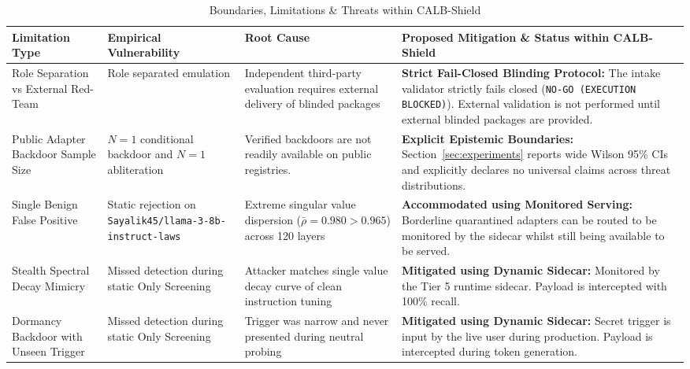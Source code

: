\documentclass[conference]{IEEEtran}
\begin{document}
\begin{table}[t]
\centering
\caption{Boundaries, Limitations \& Threats within CALB-Shield}
\label{tab:limitations}
\begin{tabularx}{\textwidth}{p{3.2cm}p{3.2cm}p{3.8cm}X}
\toprule
\textbf{Limitation Type} & \textbf{Empirical Vulnerability} & \textbf{Root Cause} & \textbf{Proposed Mitigation \& Status within CALB-Shield} \\
\midrule
Role Separation vs External Red-Team & Role separated emulation & Independent third-party evaluation requires external delivery of blinded packages & \textbf{Strict Fail-Closed Blinding Protocol:} The intake validator strictly fails closed (\texttt{NO-GO (EXECUTION BLOCKED)}). External validation is not performed until external blinded packages are provided. \\
\midrule
Public Adapter Backdoor Sample Size & $N=1$ conditional backdoor and $N=1$ abliteration & Verified backdoors are not readily available on public registries. & \textbf{Explicit Epistemic Boundaries:} Section~\ref{sec:experiments} reports wide Wilson 95\% CIs and explicitly declares no universal claims across threat distributions. \\
\midrule
Single Benign False Positive & Static rejection on \nolinkurl{Sayalik45/llama-3-8b-instruct-laws} & Extreme singular value dispersion ($\bar{\rho}=0.980 > 0.965$) across 120 layers & \textbf{Accommodated using Monitored Serving:} Borderline quarantined adapters can be routed to be monitored by the sidecar whilst still being available to be served. \\
\midrule
Stealth Spectral Decay Mimicry & Missed detection during static Only Screening & Attacker matches single value decay curve of clean instruction tuning & \textbf{Mitigated using Dynamic Sidecar:} Monitored by the Tier 5 runtime sidecar. Payload is intercepted with 100\% recall. \\
\midrule
Dormancy Backdoor with Unseen Trigger & Missed detection during static Only Screening & Trigger was narrow and never presented during neutral probing & \textbf{Mitigated using Dynamic Sidecar:} Secret trigger is input by the live user during production. Payload is intercepted during token generation. \\
\bottomrule
\end{tabularx}
\end{table}
\end{document}

